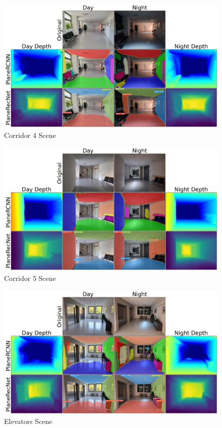 \begin{figure}[H]
    \centering
    \includegraphics[width=1.0\textwidth]{images/results/Corridor_4.png}
    \caption{Corridor 4 Scene}
    \label{figure:Corridor_4}
\end{figure}

\begin{figure}[H]
    \centering
    \includegraphics[width=1.0\textwidth]{images/results/Corridor_5.png}
    \caption{Corridor 5 Scene}
    \label{figure:Corridor_5}
\end{figure}

\begin{figure}[H]
    \centering
    \includegraphics[width=1.0\textwidth]{images/results/Elevators.png}
    \caption{Elevators Scene}
    \label{figure:Elevators}
\end{figure}

